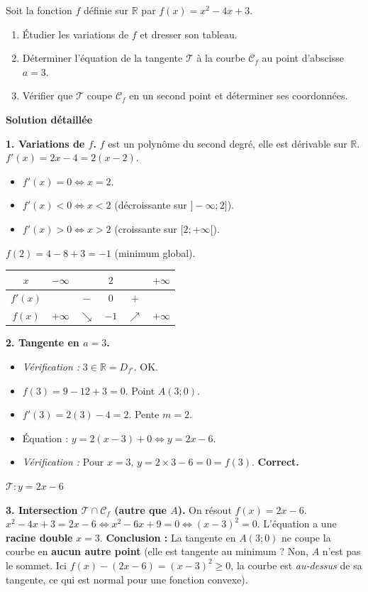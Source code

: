 \documentclass[11pt]{article}
\begin{document}
\begin{exoresolu}
Soit la fonction $f$ définie sur $\mathbb{R}$ par $f(x) = x^2 - 4x + 3$.
\begin{enumerate}
    \item Étudier les variations de $f$ et dresser son tableau.
    \item Déterminer l'équation de la tangente $\mathcal{T}$ à la courbe $\mathcal{C}_f$ au point d'abscisse $a = 3$.
    \item Vérifier que $\mathcal{T}$ coupe $\mathcal{C}_f$ en un second point et déterminer ses coordonnées.
\end{enumerate}

\tcblower
\textbf{Solution détaillée}

\textbf{1. Variations de $f$.}
$f$ est un polynôme du second degré, elle est dérivable sur $\mathbb{R}$.
$f'(x) = 2x - 4 = 2(x-2)$.
\begin{itemize}
    \item $f'(x) = 0 \iff x = 2$.
    \item $f'(x) < 0 \iff x < 2$ (décroissante sur $]-\infty; 2]$).
    \item $f'(x) > 0 \iff x > 2$ (croissante sur $[2; +\infty[$).
\end{itemize}
$f(2) = 4 - 8 + 3 = -1$ (minimum global).
\begin{center}
\begin{tabular}{|c|ccccc|}\hline
$x$ & $-\infty$ & & $2$ & & $+\infty$ \\ \hline
$f'(x)$ & & $-$ & $0$ & $+$ & \\ \hline
$f(x)$ & $+\infty$ & $\searrow$ & $-1$ & $\nearrow$ & $+\infty$ \\ \hline
\end{tabular}
\end{center}

\textbf{2. Tangente en $a=3$.}
\begin{itemize}
    \item \textit{Vérification :} $3 \in \mathbb{R} = D_{f'}$. OK.
    \item $f(3) = 9 - 12 + 3 = 0$. Point $A(3;0)$.
    \item $f'(3) = 2(3) - 4 = 2$. Pente $m=2$.
    \item Équation : $y = 2(x-3) + 0 \iff y = 2x - 6$.
    \item \textit{Vérification :} Pour $x=3$, $y = 2\times 3 - 6 = 0 = f(3)$. \textbf{Correct.}
\end{itemize}
$\boxed{\mathcal{T} : y = 2x - 6}$

\textbf{3. Intersection $\mathcal{T} \cap \mathcal{C}_f$ (autre que $A$).}
On résout $f(x) = 2x - 6$.
$x^2 - 4x + 3 = 2x - 6 \iff x^2 - 6x + 9 = 0 \iff (x-3)^2 = 0$.
L'équation a une \textbf{racine double} $x=3$.
\textbf{Conclusion :} La tangente en $A(3;0)$ ne coupe la courbe en \textbf{aucun autre point} (elle est tangente au minimum ? Non, $A$ n'est pas le sommet. Ici $f(x) - (2x-6) = (x-3)^2 \ge 0$, la courbe est \emph{au-dessus} de sa tangente, ce qui est normal pour une fonction convexe).
\end{exoresolu}
\end{document}
